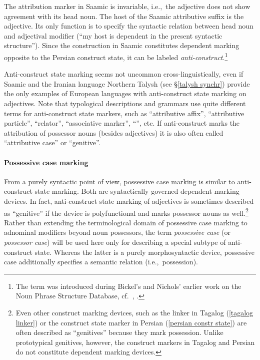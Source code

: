 The attribution marker in Saamic is invariable, i.e.,~the adjective does not show agreement with its head noun. The host of the Saamic attributive suffix is the adjective. Its only function is to specify the syntactic relation between head noun and adjectival modifier (“my host is dependent in the present syntactic structure”). Since the construction in Saamic constitutes dependent marking opposite to the Persian construct state, it can be labeled \emph{anti\hyp{}construct}.\footnote{The term was introduced during Bickel's and Nichols' earlier work on the  Noun Phrase Structure Database, cf.~\citet[2, passim]{bickel-etal2002}, \citet{AUTOTYP-NP}.} 

Anti\hyp{}construct state marking seems not uncommon cross-linguistically, even if Saamic and the Iranian language Northern Talysh (see \S\ref{talysh synchr}) provide the only examples of European languages with anti\hyp{}construct state marking on adjectives. Note that typological descriptions and grammars use quite different terms for anti\hyp{}construct state markers, such as “attributive affix”, “attributive particle”, “relator”, “associative marker”, “”, etc. If anti\hyp{}construct marks the attribution of possessor nouns (besides adjectives) it is also often called “attributive case” or “genitive”.

\paragraph*{Possessive case marking} 
From a purely syntactic point of view, possessive case marking is similar to anti\hyp{}construct state marking. Both are syntactically governed dependent marking devices. In fact, anti\hyp{}construct state marking of adjectives is sometimes described as “genitive” if the device is polyfunctional and marks possessor nouns as well.\footnote{Even other construct marking devices, such as the linker in Tagalog (\ref{tagalog linker}) or the construct state marker in Persian (\ref{persian constr state}) are often described as “genitives” because they mark possession. Unlike prototypical genitives, however, the construct markers in Tagalog and Persian do not constitute dependent marking devices.} Rather than extending the terminological domain of possessive case marking to adnominal modifiers beyond noun possessors, the term \emph{possessive case} (or \emph{possessor case}) will be used here only for describing a special subtype of anti\hyp{}construct state. Whereas the latter is a purely morphosyntactic device, possessive case additionally specifies a semantic relation (i.e.,~possession).

